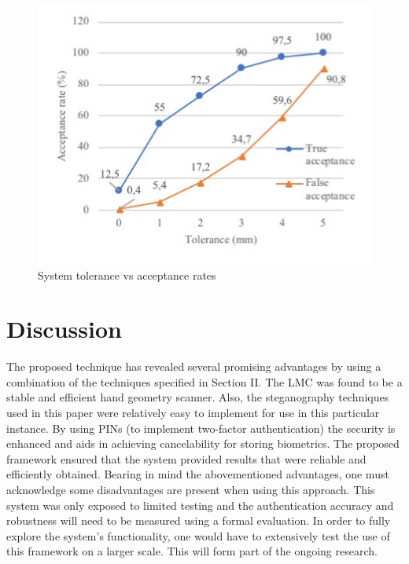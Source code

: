     
    \begin{figure}[htbp!] 
    \centering    
    \includegraphics[width=1.0\textwidth]{Chapter4/Figs/ToleranceVsAcceptanceGraph.jpg}
    \caption[System tolerance vs acceptance rates]{System tolerance vs acceptance rates}
    \label{fig:System tolerance vs acceptance rates}
    \end{figure}


\section{Discussion}

The proposed technique has revealed several promising advantages by using a combination of the techniques specified in Section II. The LMC was found to be a stable and efficient hand geometry scanner. Also, the steganography techniques used in this paper were relatively easy to implement for use in this particular instance. By using PINs (to implement two-factor authentication) the security is enhanced and aids in achieving cancelability for storing biometrics. The proposed framework ensured that the system provided results that were reliable and efficiently obtained.
Bearing in mind the abovementioned advantages, one must acknowledge some disadvantages are present when using this approach. This system was only exposed to limited testing and the authentication accuracy and robustness will need to be measured using a formal evaluation. In order to fully explore the system’s functionality, one would have to extensively test the use of this framework on a larger scale. This will form part of the ongoing research.


